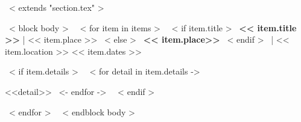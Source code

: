 ~< extends "section.tex" >~

~< block body >~
    ~< for item in items >~
      ~< if item.title >~
      \textbf{<< item.title >>} | << item.place >>
      ~< else >~
      \textbf{<< item.place>>}
      ~< endif >~
      | << item.location >>
      \hfill << item.dates >> \par
        ~< if item.details >~
        ~< for detail in item.details ->~
            \par <<detail>>
        ~<- endfor ->~
        ~< endif >~
        
    ~< endfor >~
~< endblock body >~
